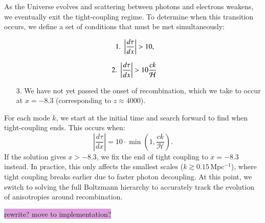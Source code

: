 \documentclass{aa}
\numberwithin{equation}{section}
\numberwithin{table}{section}
\numberwithin{figure}{section}
\begin{document}
As the Universe evolves and scattering between photons and electrons weakens, we eventually exit the tight-coupling regime. To determine when this transition occurs, we define a set of conditions that must be met simultaneously: 
\begin{enumerate}
  \item [] \vspace{-19pt}\begin{equation} \hspace{-12.3pt}1. \hspace{3.1pt}
    \left|\frac{d\tau}{dx}\right| > 10,
  \end{equation}
  \item [] \vspace{-13pt}\begin{equation} \hspace{-12.3pt}2. \hspace{3.1pt}
    \left|\frac{d\tau}{dx}\right| > 10 \frac{ck}{\mathcal{H}}
  \end{equation}
  \item [3.] We have not yet passed the onset of recombination, which we take to occur at $x = -8.3$ (corresponding to $z \approx 4000$).  
\end{enumerate}

For each mode $k$, we start at the initial time and search forward to find when tight-coupling ends. This occurs when:
\begin{equation}
\left| \frac{d\tau}{dx} \right| = 10 \cdot \min\left(1, \frac{ck}{\mathcal{H}} \right).
\end{equation}
If the solution gives $x > -8.3$, we fix the end of tight coupling to $x = -8.3$ instead. In practice, this only affects the smallest scales ($k \gtrsim 0.15\,$Mpc$^{-1}$), where tight coupling breaks earlier due to faster photon decoupling. At this point, we switch to solving the full Boltzmann hierarchy to accurately track the evolution of anisotropies around recombination. 

\colorbox{Plum}{rewrite? move to implementation?}

\end{document}
